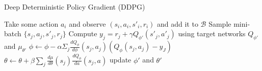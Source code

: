 \begin{algorithm}[t!]
\caption{Deep Deterministic Policy Gradient (DDPG)}
\begin{algorithmic}[1]
\label{alg:ddpg}
    \STATE Take some action $a_i$ and observe $(s_i,a_i,s'_i,r_i)$ and add it to $\mathcal{B}$
    \STATE Sample mini-batch $\{s_j,a_j,s'_j,r_j\}$
    \STATE Compute $y_j = r_j + \gamma Q_{\phi'}(s'_j,a'_j)$ using target networks $Q_{\phi'}$ and $\mu_{\theta'}$
    \STATE $\phi \leftarrow \phi-\alpha\Sigma_j\frac{dQ_\phi}{d\phi}(s_j,a_j)(Q_\phi(s_j,a_j) - y_J)$
    \STATE $\theta \leftarrow \theta + \beta\sum_j\frac{d\mu}{d\theta}(s_j)\frac{dQ_\phi}{da}(s_j,a)$
    \STATE update $\phi'$ and $\theta'$
\ENDWHILE
\end{algorithmic}
\end{algorithm}